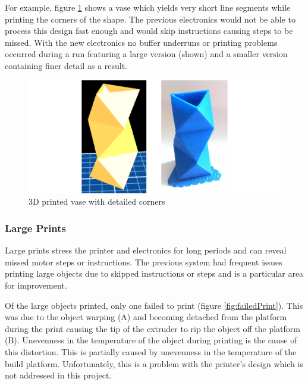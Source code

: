 				For example, figure \ref{fig:vase} shows a vase which yields very short
				line segments while printing the corners of the shape. The previous
				electronics would not be able to process this design fast enough and
				would skip instructions causing steps to be missed. With the new
				electronics no buffer underruns or printing problems occurred during a
				run featuring a large version (shown) and a smaller version containing
				finer detail as a result.
				
				\begin{figure}
					\includegraphics[width=1\textwidth]{diagrams/vase.pdf}
					\caption{3D printed vase with detailed corners}
					\label{fig:vase}
				\end{figure}
			
			\subsubsection{Large Prints}
				
				
				Large prints stress the printer and electronics for long periods and can
				reveal missed motor steps or instructions. The previous system had
				frequent issues printing large objects due to skipped instructions or
				steps and is a particular area for improvement.
				
				Of the large objects printed, only one failed to print (figure
				\ref{fig:failedPrint}). This was due to the object warping (A) and
				becoming detached from the platform during the print causing the tip of
				the extruder to rip the object off the platform (B). Unevenness in the
				temperature of the object during printing is the cause of this
				distortion. This is partially caused by unevenness in the temperature of
				the build platform. Unfortunately, this is a problem with the printer's
				design which is not addressed in this project.
				
